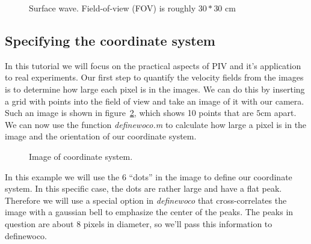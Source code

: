 \documentclass{book}
\begin{document}
\begin{figure}
\caption[\ ]{\label{fig:mpimages} Surface wave. Field-of-view (FOV) is roughly $30*30$ cm}
\end{figure}

\subsection{Specifying the coordinate system}
In this tutorial we will focus on the practical aspects of PIV and
it's application to real experiments. Our first step to quantify the
velocity fields from the images is to determine how large each pixel
is in the images. We can do this by inserting a grid with points into
the field of view and take an image of it with our camera. Such an
image is shown in figure~\ref{fig:mpwoco}, which shows 10 points that
are $5$cm apart. We can now use the function {\it definewoco.m} to
calculate how large a pixel is in the image and the orientation of our
coordinate system.
\begin{figure}
\caption[\ ]{\label{fig:mpwoco} Image of coordinate system.}
\end{figure}
In this example we will use the 6 ``dots'' in the image to define our
coordinate system. In this specific case, the dots are rather large and
have a flat peak. Therefore we will use a special option in {\it
definewoco} that cross-correlates the image with a gaussian bell to
emphasize the center of the peaks. The peaks in question are about 8
pixels in diameter, so we'll pass this information to definewoco.
\end{document}
